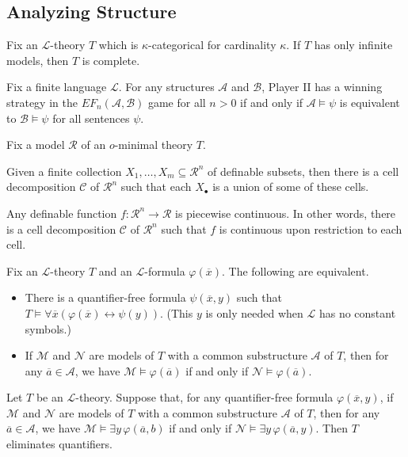 \documentclass{article}
\begin{document}
\subsection{Analyzing Structure}
\begin{proposition} \label{prop:kappa-categorical-is-complete}
	Fix an $\mathcal L$-theory $T$ which is $\kappa$-categorical for cardinality $\kappa$. If $T$ has only infinite models, then $T$ is complete.
\end{proposition}
\begin{proposition} \label{prop:winning-ef-game}
	Fix a finite language $\mathcal L$. For any structures $\mathcal A$ and $\mathcal B$, Player II has a winning strategy in the $EF_n(\mathcal A,\mathcal B)$ game for all $n>0$ if and only if $\mathcal A\models\psi$ is equivalent to $\mathcal B\models\psi$ for all sentences $\psi$.
\end{proposition}
\begin{theorem} \label{thm:cell-decomp}
	Fix a model $\mathcal R$ of an $o$-minimal theory $T$.
	\begin{listalph}
		\item Given a finite collection $X_1,\ldots,X_m\subseteq\mathcal R^n$ of definable subsets, then there is a cell decomposition $\mathcal C$ of $\mathcal R^n$ such that each $X_\bullet$ is a union of some of these cells.
		\item Any definable function $f\colon\mathcal R^n\to\mathcal R$ is piecewise continuous. In other words, there is a cell decomposition $\mathcal C$ of $\mathcal R^n$ such that $f$ is continuous upon restriction to each cell.
	\end{listalph}
\end{theorem}
\begin{theorem}
	Fix an $\mathcal L$-theory $T$ and an $\mathcal L$-formula $\varphi(\overline x)$. The following are equivalent.
	\begin{itemize}
		\item There is a quantifier-free formula $\psi(\overline x,y)$ such that $T\models\forall\overline x(\varphi(\overline x)\leftrightarrow\psi(y))$. (This $y$ is only needed when $\mathcal L$ has no constant symbols.)
		\item If $\mathcal M$ and $\mathcal N$ are models of $T$ with a common substructure $\mathcal A$ of $T$, then for any $\overline a\in\mathcal A$, we have $\mathcal M\models\varphi(\overline a)$ if and only if $\mathcal N\models\varphi(\overline a)$.
	\end{itemize}
\end{theorem}
\begin{corollary}
	Let $T$ be an $\mathcal L$-theory. Suppose that, for any quantifier-free formula $\varphi(\overline x,y)$, if $\mathcal M$ and $\mathcal N$ are models of $T$ with a common substructure $\mathcal A$ of $T$, then for any $\overline a\in\mathcal A$, we have $\mathcal M\models\exists y\,\varphi(\overline a,b)$ if and only if $\mathcal N\models\exists y\,\varphi(\overline a,y)$. Then $T$ eliminates quantifiers.
\end{corollary}
\end{document}
